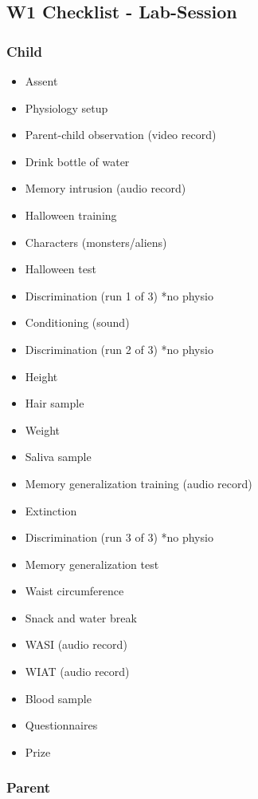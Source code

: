 \documentclass[
]{book}
\providecommand{\tightlist}{%
  \setlength{\itemsep}{0pt}\setlength{\parskip}{0pt}}
\begin{document}
\hypertarget{w1-checklist---lab-session}{%
\subsection{W1 Checklist - Lab-Session}\label{w1-checklist---lab-session}}

\hypertarget{child-1}{%
\subsubsection{Child}\label{child-1}}

\begin{itemize}
\tightlist
\item
  Assent
\item
  Physiology setup
\item
  Parent-child observation (video record)
\item
  Drink bottle of water
\item
  Memory intrusion (audio record)
\item
  Halloween training
\item
  Characters (monsters/aliens)
\item
  Halloween test
\item
  Discrimination (run 1 of 3) *no physio
\item
  Conditioning (sound)
\item
  Discrimination (run 2 of 3) *no physio
\item
  Height
\item
  Hair sample
\item
  Weight
\item
  Saliva sample
\item
  Memory generalization training (audio record)
\item
  Extinction
\item
  Discrimination (run 3 of 3) *no physio
\item
  Memory generalization test
\item
  Waist circumference
\item
  Snack and water break
\item
  WASI (audio record)
\item
  WIAT (audio record)
\item
  Blood sample
\item
  Questionnaires
\item
  Prize
\end{itemize}

\hypertarget{parent-1}{%
\subsubsection{Parent}\label{parent-1}}
\end{document}
